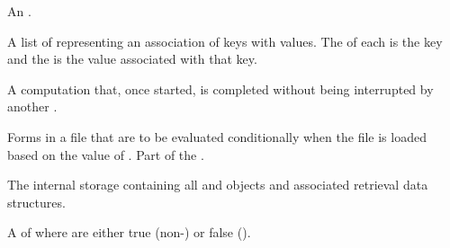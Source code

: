 
\begin{glossary-list}
  
  
\glent[alist]
%
%
An .


%
%
A list of  representing an association of keys with values. The
 of each  is the key and the  is the value
associated with that key.


%
%
A computation that, once started, is completed without being interrupted by
another .


%
%
Forms in a  file that are to be evaluated conditionally when the
file is loaded based on the value of .
Part of the .


%
%
The internal storage containing all  and
 objects and associated retrieval data structures.


%
%
%
%
A  of   where
  are either true (non-\nil) or
false (\nil).



\end{glossary-list}
